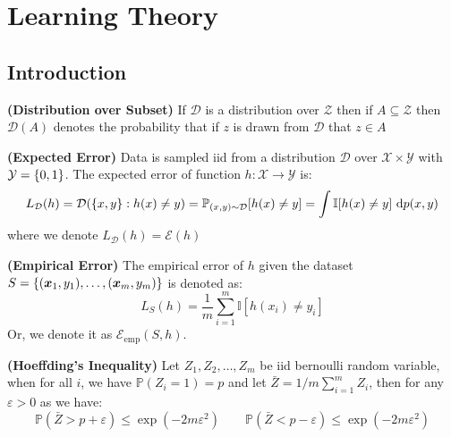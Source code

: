 \section{Learning Theory}

\subsection{Introduction}

\begin{definition}{\textbf{(Distribution over Subset)}}
    If $\mathcal{D}$ is a distribution over $\mathcal{Z}$ then if $A\subseteq \mathcal{Z}$ then $\mathcal{D}(A)$ denotes the probability that if $z$ is drawn from $\mathcal{D}$ that $z \in A$
\end{definition}

\begin{definition}{\textbf{(Expected Error)}}
    Data is sampled iid from a distribution $\mathcal{D}$ over $\mathcal{X}\times\mathcal{Y}$ with $\mathcal{Y} = \left\{ 0, 1 \right\}$. The expected error of function $h : \mathcal{X}\rightarrow\mathcal{Y}$ is:
    \begin{equation*}
        L_\mathcal{D}(h) = \mathcal{D}(\left\{ x, y \right\} : h(x)\ne y) = \mathbb{P}_{(x, y)\sim\mathcal{D}}[h(x)\ne y] = \int \mathbb{I}[h(x) \ne y]\ \mathrm{d} p(x, y)
    \end{equation*}
    where we denote $L_\mathcal{D}(h) = \mathcal{E}(h)$
\end{definition}

\begin{definition}{\textbf{(Empirical Error)}}
   The empirical error of $h$ given the dataset $S = \left\{ (\boldsymbol x_1, y_1),\dots,(\boldsymbol x_m, y_m) \right\}$ is denoted as:
   \begin{equation*}
       L_S(h) = \frac{1}{m}\sum^m_{i=1}\mathbb{I}[h(x_i) \ne y_i]
   \end{equation*}
   Or, we denote it as $\mathcal{E}_\text{emp}(S, h)$.
\end{definition}

\begin{theorem}{\textbf{(Hoeffding's Inequality)}}
    Let $Z_1,Z_2,\dots,Z_m$ be iid bernoulli random variable, when for all $i$, we have $\mathbb{P}(Z_i = 1) = p$ and let $\bar{Z} = 1/m\sum^m_{i=1}Z_i$, then for any $\varepsilon > 0$ as we have:
    \begin{equation*}
        \mathbb{P}(\bar{Z} > p +\varepsilon) \le \exp(-2m\varepsilon^2) \qquad \mathbb{P}(\bar{Z} < p - \varepsilon) \le \exp(-2m\varepsilon^2)
    \end{equation*}
\end{theorem}


